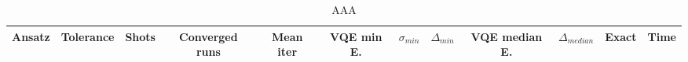 \documentclass[letterpaper,12pt,openright]{article}
\begin{document}
\begin{table}[H]
\begin{adjustbox}{width=\textwidth}
\begin{tabular}{cccccccccccc}
%
%
\hline
Ansatz & Tolerance & Shots & Converged runs & Mean iter & VQE min E. & $\sigma_{min}$ &$\Delta_{min}$ & VQE median E. &$\Delta_{median}$ & Exact & Time \\
\hline
\hline
\end{tabular}

\end{adjustbox}

\caption{AAA}\label{table:Table_Caption}
\end{table}
\end{document}
